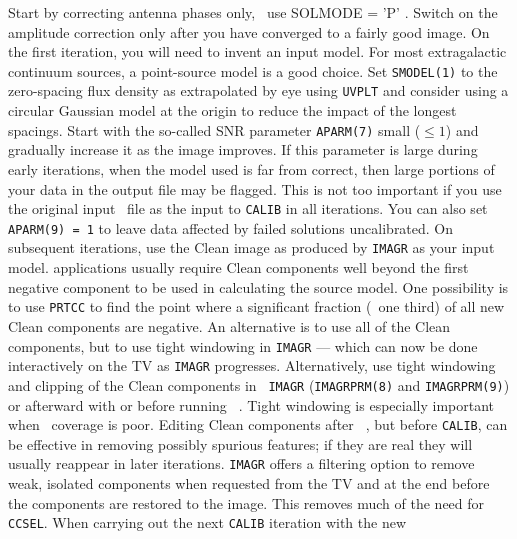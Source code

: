 
\xben
\Item Start by correcting antenna phases only, \ie\ use {\us SOLMODE =
    'P' \CR}\@.  Switch on the amplitude correction only after you
    have converged to a fairly good image.  On the first iteration,
    you will need to invent an input model.  For most extragalactic
    continuum sources, a point-source model is a good choice.  Set
    {\tt SMODEL(1)} to the zero-spacing flux density as extrapolated
    by eye using {\tt UVPLT} and consider using a circular Gaussian
    model at the origin to reduce the impact of the longest spacings.
    Start with the so-called SNR parameter {\tt APARM(7)} small ($\leq
    1$) and gradually increase it as the image improves.  If this
    parameter is large during early iterations, when the model used is
    far from correct, then large portions of your data in the output
    file may be flagged.  This is not too important if you use the
    original input \uv\ file as the input to {\tt CALIB} in all
    iterations.  You can also set {\tt APARM(9) = 1} to leave data
    affected by failed solutions uncalibrated.
\Item On subsequent iterations, use the Clean image as produced by
    {\tt IMAGR} as your input model.   applications usually
    require Clean components well beyond the first negative component
    to be used in calculating the source model.  One possibility is to
    use {\tt PRTCC} to find the point where a significant fraction
    (\eg\ one third) of all new Clean components are negative.  An
    alternative is to use all of the Clean components, but to use
    tight windowing in {\tt IMAGR} --- which can now be done
    interactively on the TV as {\tt IMAGR} progresses.  Alternatively,
    use tight windowing and clipping of the Clean components in {\tt
    IMAGR} ({\tt IMAGRPRM(8)} and {\tt IMAGRPRM(9)}) or afterward
    with {\tt {}} or {\tt {}} before running {\tt
    }\@.  Tight windowing is especially important when
    \uv\ coverage is poor.  Editing Clean components after {\tt
    }, but before {\tt CALIB}, can be effective in
    removing possibly spurious features; if they are real they will
    usually reappear in later iterations.  {\tt IMAGR} offers a
    filtering option to remove weak, isolated components when
    requested from the TV and at the end before the components are
    restored to the image.  This removes much of the need for {\tt
    CCSEL}\@.
\Item When carrying out the next {\tt CALIB} iteration with the new
